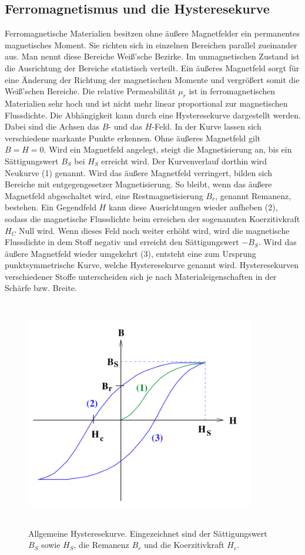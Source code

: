\subsection{Ferromagnetismus und die Hysteresekurve}
Ferromagnetische Materialien besitzen ohne äußere Magnetfelder ein permanentes 
magnetisches Moment. Sie richten sich in einzelnen Bereichen parallel zueinander aus. 
Man nennt diese Bereiche Weiß'sche Bezirke. Im unmagnetischen Zustand ist die 
Ausrichtung der Bereiche statistisch verteilt. Ein äußeres Magnetfeld sorgt für eine 
Änderung der Richtung der magnetischen Momente und vergrößert somit die Weiß'schen 
Bereiche. 
\newline
Die relative Permeabilität $\mu_{r}$ ist in ferromagnetischen Materialien sehr hoch 
und ist nicht mehr linear proportional zur magnetischen Flussdichte. 
Die Abhängigkeit kann durch eine Hysteresekurve dargestellt werden.
Dabei sind die Achsen das $B$- und das $H$-Feld.
In der Kurve lassen sich verschiedene markante Punkte erkennen. 
Ohne äußeres Magnetfeld gilt $B = H = 0$. Wird ein Magnetfeld angelegt, steigt die 
Magnetisierung an, bis ein Sättigungswert $B_{S}$ bei $H_{S}$ erreicht wird. Der 
Kurvenverlauf dorthin wird Neukurve (1) genannt. 
Wird das äußere Magnetfeld verringert, bilden sich Bereiche mit entgegengesetzer 
Magnetisierung. So bleibt, wenn das äußere Magnetfeld abgeschaltet wird, eine 
Restmagnetisierung $B_{r}$, genannt Remanenz, bestehen. 
Ein Gegendfeld $H$ kann diese Ausrichtungen wieder 
aufheben (2), sodass die magnetische Flussdichte beim erreichen der sogenannten Koerzitivkraft $H_C$ Null wird. Wenn dieses Feld noch weiter 
erhöht wird, wird die magnetische Flussdichte %
in dem Stoff negativ und erreicht den Sättigungswert $-B_{S}$. Wird das äußere 
Magnetfeld wieder umgekehrt (3), entsteht eine zum Ursprung punktsymmetrische Kurve, welche
Hysteresekurve genannt wird. Hysteresekurven verschiedener Stoffe unterscheiden sich je
nach Materialeigenschaften in der Schärfe bzw. Breite. 
\begin{figure}
    \centering
    \includegraphics[width=10cm,height=10cm]{build/Hysteresekurve.png}
    \caption{Allgemeine Hysteresekurve. Eingezeichnet sind der Sättigungswert $B_{S}$
    sowie $H_{S}$, die Remanenz $B_{r}$ und die Koerzitivkraft $H_{c}$.}
\end{figure}

